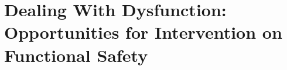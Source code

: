 \documentclass[acmconf,manuscript,screen,natbib=true]{acmart}
\begin{document}




\section{Dealing With Dysfunction: Opportunities for Intervention on Functional Safety}
\label{responses}







\end{document}
